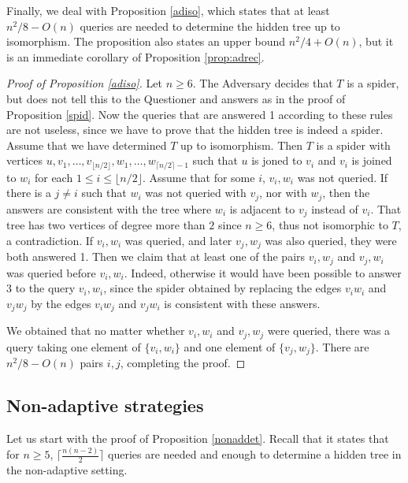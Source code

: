 \documentclass[12pt,a4paper]{amsart}
\theoremstyle{plain}
\theoremstyle{definition}
\begin{document}
Finally, we deal with Proposition \ref{adiso}, which states that at least $n^2/8-O(n)$ queries are needed to determine the hidden tree up to isomorphism. The proposition also states an upper bound $n^2/4+O(n)$, but it is an immediate corollary of Proposition \ref{prop:adrec}.

\begin{proof}[Proof of Proposition \ref{adiso}] Let $n\ge 6$.
    The Adversary decides that $T$ is a spider, but does not tell this to the Questioner
    and answers as in the proof of Proposition \ref{spid}. Now the queries that are answered 1 according to these rules are not useless, since we have to prove that the hidden tree is indeed a spider. Assume that we have determined $T$ up to isomorphism. Then $T$ is a spider with vertices $u,v_1,\dots, v_{\lfloor n/2\rfloor},w_1,\dots,w_{\lceil n/2\rceil -1}$ such that $u$ is joned to $v_i$ and $v_i$ is joined to $w_i$ for each $1\le i\le \lfloor n/2\rfloor$. Assume that for some $i$, $v_i,w_i$ was not queried. If there is a $j\neq i$ such that $w_i$ was not queried with $v_j$, nor with $w_j$, then the answers are consistent with the tree where $w_i$ is adjacent to $v_j$ instead of $v_i$. That tree has two vertices of degree more than $2$ since $n\ge 6$, thus not isomorphic to $T$, a contradiction. If $v_i,w_i$ was queried, and later $v_j,w_j$ was also queried, they were both answered 1. 
    Then we claim that at least one of the pairs $v_i,w_j$ and $v_j,w_i$ was queried before $v_i,w_i$. Indeed, otherwise it would have been possible to answer 3 to the query $v_i,w_i$, since the spider obtained by replacing the edges $v_iw_i$ and $v_jw_j$ by the edges $v_iw_j$ and $v_jw_i$ is consistent with these answers.

    We obtained that no matter whether $v_i,w_i$ and $v_j,w_j$ were queried, there was a query taking one element of $\{v_i,w_i\}$ and one element of $\{v_j,w_j\}$. There are $n^2/8-O(n)$ pairs $i,j$, completing the proof.
\end{proof}

\subsection{Non-adaptive strategies}

Let us start with the proof of Proposition \ref{nonaddet}. Recall that it states that for $n\ge 5$, $\lceil \frac{n(n-2)}{2}\rceil$ queries are needed and enough to determine a hidden tree in the non-adaptive setting.
\end{document}
